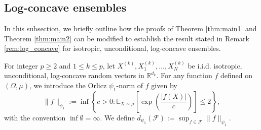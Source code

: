 \documentclass[numbers,webpdf,imaiai]{ima-authoring-template}
\theoremstyle{thmstyletwo}%
\numberwithin{equation}{section}
\numberwithin{equation}{section}
\providecommand{\mathbbm}{\mathbb} %
\newcommand{\R}{\mathbbm{R}}
\newcommand{\F}{\mathcal{F}}
\newcommand{\inparen}[1]{\left(#1\right)}             %
\newcommand{\insquare}[1]{\left[#1\right]}             %
\begin{document}
\subsection{Log-concave ensembles}\label{subsec:log-concave}

 In this subsection, we briefly outline how the proofs of Theorem \ref{thm:main1} and Theorem \ref{thm:main2} can be modified to establish the result stated in Remark \ref{rem:log_concave} for isotropic, unconditional, log-concave ensembles.

For integer $p\ge 2$ and $1 \leq k \leq p$, let $X^{(k)}, X_1^{(k)}, \ldots, X_N^{(k)}$ be i.i.d. isotropic, unconditional, log-concave random vectors in $\R^{d_k}$. For any function $f$ defined on $(\Omega,\mu)$, we introduce the Orlicz $\psi_1$-norm of $f$ given by
\[
\|f\|_{\psi_1}:=\inf \left\{c>0: 
\mathbb{E}_{X \sim \mu}\insquare{ \exp \inparen{\frac{|f(X)|}{c}}} \leq 2\right\},
\]
with the convention $\inf \emptyset = \infty.$  We define $
d_{\psi_1}(\F) := \sup_{f \in \F}\|f\|_{\psi_1}$. 
\end{document}
